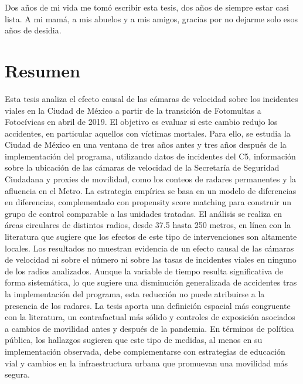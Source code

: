 \documentclass[11pt, oneside]{book}
\begin{document}
\noindent Dos años de mi vida me tomó escribir esta tesis, dos años de siempre estar casi lista. A mi mamá, a mis abuelos y a mis amigos, gracias por no dejarme solo esos años de desidia.



\chapter*{Resumen}

\noindent Esta tesis analiza el efecto causal de las cámaras de velocidad sobre los incidentes viales en la Ciudad de México a partir de la transición de Fotomultas a Fotocívicas en abril de 2019. El objetivo es evaluar si este cambio redujo los accidentes, en particular aquellos con víctimas mortales. Para ello, se estudia la Ciudad de México en una ventana de tres años antes y tres años después de la implementación del programa, utilizando datos de incidentes del C5, información sobre la ubicación de las cámaras de velocidad de la Secretaría de Seguridad Ciudadana y proxies de movilidad, como los conteos de radares permanentes y la afluencia en el Metro. La estrategia empírica se basa en un modelo de diferencias en diferencias, complementado con propensity score matching para construir un grupo de control comparable a las unidades tratadas. El análisis se realiza en áreas circulares de distintos radios, desde 37.5 hasta 250 metros, en línea con la literatura que sugiere que los efectos de este tipo de intervenciones son altamente locales. Los resultados no muestran evidencia de un efecto causal de las cámaras de velocidad ni sobre el número ni sobre las tasas de incidentes viales en ninguno de los radios analizados. Aunque la variable de tiempo resulta significativa de forma sistemática, lo que sugiere una disminución generalizada de accidentes tras la implementación del programa, esta reducción no puede atribuirse a la presencia de los radares. La tesis aporta una definición espacial más congruente con la literatura, un contrafactual más sólido y controles de exposición asociados a cambios de movilidad antes y después de la pandemia. En términos de política pública, los hallazgos sugieren que este tipo de medidas, al menos en su implementación observada, debe complementarse con estrategias de educación vial y cambios en la infraestructura urbana que promuevan una movilidad más segura.
\pagestyle{plain}
\end{document}
